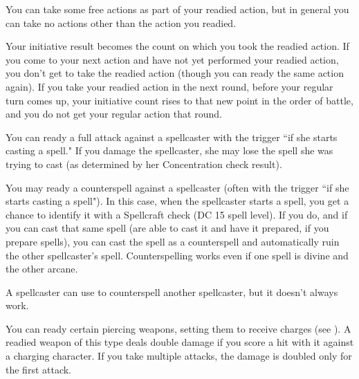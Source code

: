 You can take some free actions as part of your readied action, but in general you can take no actions other than the action you readied.

 Your initiative result becomes the count on which you took the readied action. If you come to your next action and have not yet performed your readied action, you don't get to take the readied action (though you can ready the same action again). If you take your readied action in the next round, before your regular turn comes up, your initiative count rises to that new point in the order of battle, and you do not get your regular action that round.

 You can ready a full attack against a spellcaster with the trigger ``if she starts casting a spell." If you damage
the spellcaster, she may lose the spell she was trying to cast (as determined by her Concentration check result).

 You may ready a counterspell against a spellcaster (often with the trigger ``if she starts casting a spell"). In this case, when the spellcaster starts a spell, you get a chance to identify it with a Spellcraft check (DC 15 \add spell level). If you do, and if you can cast that same spell (are able to cast it and have it prepared, if you prepare spells), you can cast the spell as a counterspell and automatically ruin the other spellcaster's spell. Counterspelling works even if one spell is divine and the other arcane.

A spellcaster can use  to counterspell another spellcaster, but it doesn't always work.

 You can ready certain piercing weapons, setting them to receive charges (see ). A readied weapon of this type deals double damage if you score a hit with it against a charging character. If you take multiple attacks, the damage is doubled only for the first attack.
